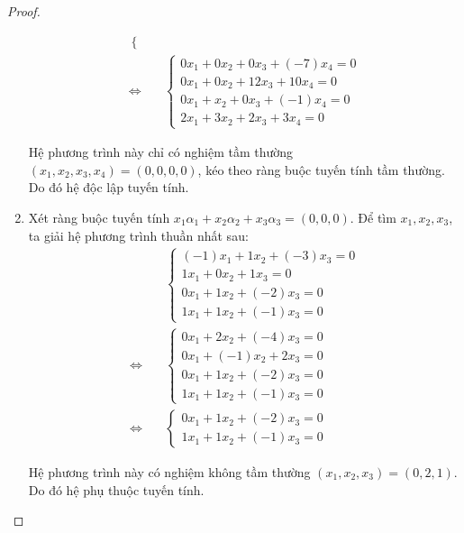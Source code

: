 \documentclass[class=linearalgebra,crop=false]{standalone}
\begin{document}
\begin{proof}
\begin{enumerate}[label = (\alph*)]
\begin{align*}
\begin{cases}
                \end{cases} \\
                \Leftrightarrow\quad&
                \begin{cases}
                    0x_{1} + 0x_{2} + 0x_{3} + (-7)x_{4} = 0 \\
                    0x_{1} + 0x_{2} + 12x_{3} + 10x_{4} = 0 \\
                    0x_{1} + x_{2} + 0x_{3} + (-1)x_{4} = 0 \\
                    2x_{1} + 3x_{2} + 2x_{3} + 3x_{4} = 0
                \end{cases}
            \end{align*}
            \par Hệ phương trình này chỉ có nghiệm tầm thường $(x_{1}, x_{2}, x_{3}, x_{4}) = (0, 0, 0, 0)$, kéo theo ràng buộc tuyến tính tầm thường. Do đó hệ độc lập tuyến tính.
        \item Xét ràng buộc tuyến tính $x_{1}\alpha_{1} + x_{2}\alpha_{2} + x_{3}\alpha_{3} = (0, 0, 0)$. Để tìm $x_{1}, x_{2}, x_{3}$, ta giải hệ phương trình thuần nhất sau:
            \begin{align*}
                &\begin{cases}
                    (-1)x_{1} + 1x_{2} + (-3)x_{3} = 0 \\
                    1x_{1} + 0x_{2} + 1x_{3} = 0 \\
                    0x_{1} + 1x_{2} + (-2)x_{3} = 0 \\
                    1x_{1} + 1x_{2} + (-1)x_{3} = 0
                \end{cases} \\
                \Leftrightarrow\quad&
                \begin{cases}
                    0x_{1} + 2x_{2} + (-4)x_{3} = 0 \\
                    0x_{1} + (-1)x_{2} + 2x_{3} = 0 \\
                    0x_{1} + 1x_{2} + (-2)x_{3} = 0 \\
                    1x_{1} + 1x_{2} + (-1)x_{3} = 0
                \end{cases} \\
                \Leftrightarrow\quad&
                \begin{cases}
                    0x_{1} + 1x_{2} + (-2)x_{3} = 0 \\
                    1x_{1} + 1x_{2} + (-1)x_{3} = 0
                \end{cases}
            \end{align*}
            \par Hệ phương trình này có nghiệm không tầm thường $(x_{1}, x_{2}, x_{3}) = (0, 2, 1)$. Do đó hệ phụ thuộc tuyến tính.
    \end{enumerate}
\end{proof}
\end{document}
